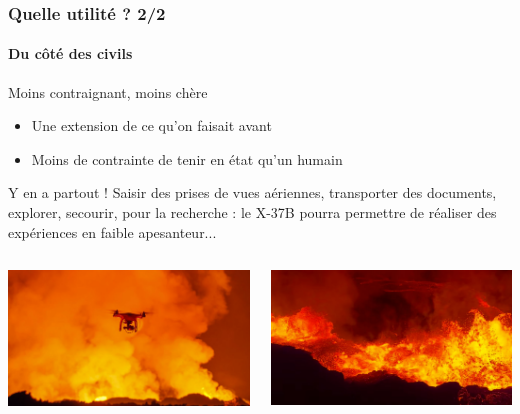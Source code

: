 \documentclass{beamer}
\begin{document}
\begin{frame}
  \frametitle{Quelle utilité ? 2/2}
  \framesubtitle{Du côté des civils}
  \begin{block}{Moins contraignant, moins chère}
    \begin{itemize}
      \item Une extension de ce qu'on faisait avant
      \item Moins de contrainte de tenir en état qu'un humain
    \end{itemize}
  \end{block}
  \begin{block}{Y en a partout !}
    Saisir des prises de vues aériennes, transporter des documents, explorer, secourir, pour la recherche : le X-37B pourra permettre de réaliser des expériences en faible apesanteur...
  \end{block}
  \begin{columns}
    \begin{column}{.5\textwidth}
      \includegraphics[width=\textwidth]{../Images/dangereux.jpg}
    \end{column}
    \begin{column}{.5\textwidth}
      \includegraphics[width=\textwidth]{../Images/dangereux2.jpg}
    \end{column}
  \end{columns}
\end{frame}
\end{document}
